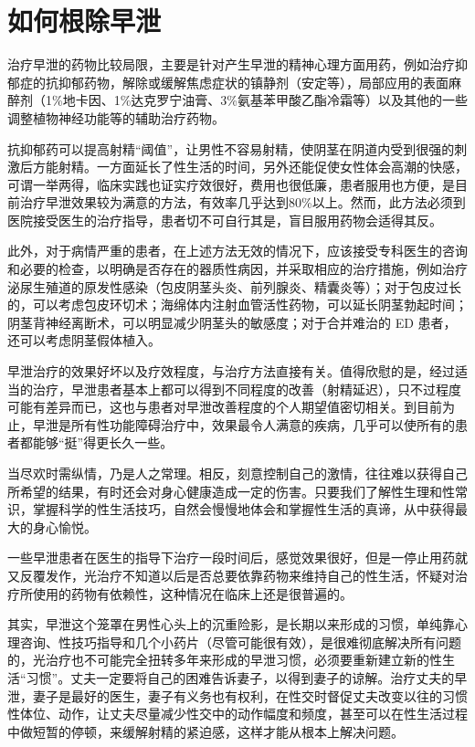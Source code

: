 \documentclass[12pt,UTF8]{ctexbook}
\begin{document}
\section{如何根除早泄}

治疗早泄的药物比较局限，主要是针对产生早泄的精神心理方面用药，例如治疗抑郁症的抗抑郁药物，解除或缓解焦虑症状的镇静剂（安定等），局部应用的表面麻醉剂（1\%地卡因、1\%达克罗宁油膏、3\%氨基苯甲酸乙酯冷霜等）以及其他的一些调整植物神经功能等的辅助治疗药物。

抗抑郁药可以提高射精“阈值”，让男性不容易射精，使阴茎在阴道内受到很强的刺激后方能射精。一方面延长了性生活的时间，另外还能促使女性体会高潮的快感，可谓一举两得，临床实践也证实疗效很好，费用也很低廉，患者服用也方便，是目前治疗早泄效果较为满意的方法，有效率几乎达到80\%以上。然而，此方法必须到医院接受医生的治疗指导，患者切不可自行其是，盲目服用药物会适得其反。

此外，对于病情严重的患者，在上述方法无效的情况下，应该接受专科医生的咨询和必要的检查，以明确是否存在的器质性病因，并采取相应的治疗措施，例如治疗泌尿生殖道的原发性感染（包皮阴茎头炎、前列腺炎、精囊炎等）；对于包皮过长的，可以考虑包皮环切术；海绵体内注射血管活性药物，可以延长阴茎勃起时间；阴茎背神经离断术，可以明显减少阴茎头的敏感度；对于合并难治的 ED 患者，还可以考虑阴茎假体植入。

早泄治疗的效果好坏以及疗效程度，与治疗方法直接有关。值得欣慰的是，经过适当的治疗，早泄患者基本上都可以得到不同程度的改善（射精延迟），只不过程度可能有差异而已，这也与患者对早泄改善程度的个人期望值密切相关。到目前为止，早泄是所有性功能障碍治疗中，效果最令人满意的疾病，几乎可以使所有的患者都能够“挺”得更长久一些。

当尽欢时需纵情，乃是人之常理。相反，刻意控制自己的激情，往往难以获得自己所希望的结果，有时还会对身心健康造成一定的伤害。只要我们了解性生理和性常识，掌握科学的性生活技巧，自然会慢慢地体会和掌握性生活的真谛，从中获得最大的身心愉悦。

一些早泄患者在医生的指导下治疗一段时间后，感觉效果很好，但是一停止用药就又反覆发作，光治疗不知道以后是否总要依靠药物来维持自己的性生活，怀疑对治疗所使用的药物有依赖性，这种情况在临床上还是很普遍的。

其实，早泄这个笼罩在男性心头上的沉重险影，是长期以来形成的习惯，单纯靠心理咨询、性技巧指导和几个小药片（尽管可能很有效），是很难彻底解决所有问题的，光治疗也不可能完全扭转多年来形成的早泄习惯，必须要重新建立新的性生活“习惯”。丈夫一定要将自己的困难告诉妻子，以得到妻子的谅解。治疗丈夫的早泄，妻子是最好的医生，妻子有义务也有权利，在性交时督促丈夫改变以往的习惯性体位、动作，让丈夫尽量减少性交中的动作幅度和频度，甚至可以在性生活过程中做短暂的停顿，来缓解射精的紧迫感，这样才能从根本上解决问题。
\end{document}
